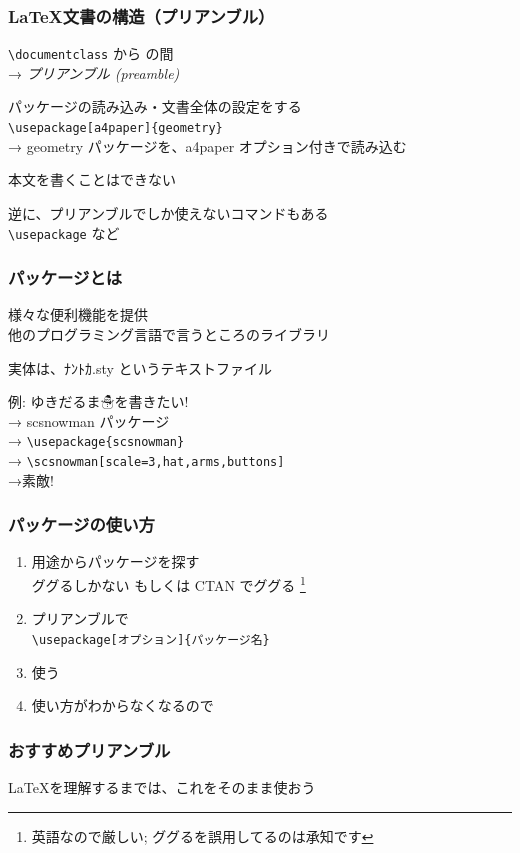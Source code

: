 \begin{frame}[fragile]
	\frametitle{\LaTeX 文書の構造（プリアンブル）}
	\verb+\documentclass+ から \verb++ の間\\
	→ \emph{プリアンブル (preamble)}
	
	パッケージの読み込み・文書全体の設定をする\\
	{\footnotesize\verb+\usepackage[a4paper]{geometry}+\\
	→ geometry パッケージを、a4paper オプション付きで読み込む}
	
	本文を書くことはできない
	
	逆に、プリアンブルでしか使えないコマンドもある\\
	{\footnotesize \verb+\usepackage+ など}
\end{frame}

\begin{frame}[fragile]
	\frametitle{パッケージとは}
	様々な便利機能を提供\\
	{\footnotesize 他のプログラミング言語で言うところのライブラリ}
	
	実体は、ﾅﾝﾄｶ.sty というテキストファイル
	
	例: ゆきだるま☃を書きたい!\\
	→ scsnowman パッケージ\\
	→ \verb+\usepackage{scsnowman}+ \\
	→ \verb+\scsnowman[scale=3,hat,arms,buttons]+ \\
	→\scsnowman[scale=3,hat,arms,buttons] 素敵!
\end{frame}

\begin{frame}[fragile]
	\frametitle{パッケージの使い方}
	\begin{enumerate}
		\item 用途からパッケージを探す\\
			{\footnotesize ググるしかない もしくは CTAN でググる
			\footnote{英語なので厳しい; {\tiny ググるを誤用してるのは承知です}}}
		\item プリアンブルで\\\verb+\usepackage[オプション]{パッケージ名}+
		\item 使う
		\item 使い方がわからなくなるので 
	\end{enumerate}
\end{frame}

\begin{frame}[fragile]
	\frametitle{おすすめプリアンブル}
	
	
	\LaTeX を理解するまでは、これをそのまま使おう
\end{frame}

